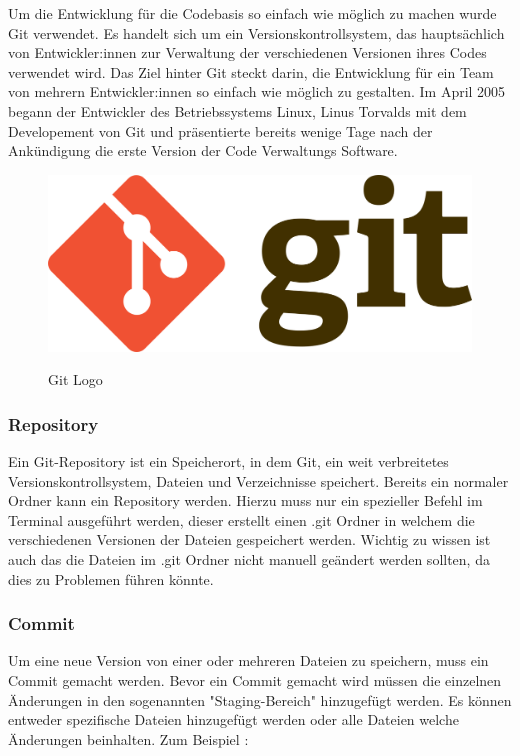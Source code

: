 Um die Entwicklung für die Codebasis so einfach wie möglich zu machen wurde Git verwendet. Es handelt sich um ein Versionskontrollsystem, das hauptsächlich von Entwickler:innen zur Verwaltung der verschiedenen Versionen ihres Codes verwendet wird. Das Ziel hinter Git steckt darin, die Entwicklung für ein Team von mehrern Entwickler:innen so einfach wie möglich zu gestalten. Im April 2005 begann der Entwickler des Betriebssystems Linux, Linus Torvalds mit dem Developement von Git und präsentierte bereits wenige Tage nach der Ankündigung die erste Version der Code Verwaltungs Software.

\begin{figure}[h!]
    \centering
    \includegraphics[width=0.5\linewidth]{pics/git-logo.png}
    \caption{Git Logo}
    \label{fig:enter-label}
    \cite{git_grafik}
\end{figure}

\cite{Git}

\subsubsection{Repository}

Ein Git-Repository ist ein Speicherort, in dem Git, ein weit verbreitetes Versionskontrollsystem, Dateien und Verzeichnisse speichert. Bereits ein normaler Ordner kann ein Repository werden. Hierzu muss nur ein spezieller Befehl im Terminal ausgeführt werden, dieser erstellt einen .git Ordner in welchem die verschiedenen Versionen der Dateien gespeichert werden. Wichtig zu wissen ist auch das die Dateien im .git Ordner nicht manuell geändert werden sollten, da dies zu Problemen führen könnte.

\subsubsection{Commit}

Um eine neue Version von einer oder mehreren Dateien zu speichern, muss ein Commit gemacht werden. Bevor ein Commit gemacht wird müssen die einzelnen Änderungen in den sogenannten "Staging-Bereich" hinzugefügt werden. Es können entweder spezifische Dateien hinzugefügt werden oder alle Dateien welche Änderungen beinhalten. Zum Beispiel :

